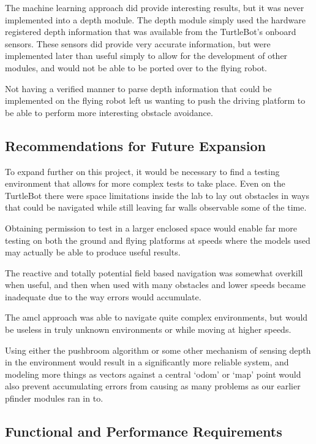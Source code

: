 \documentclass{article}[12]
\begin{document}
The machine learning approach did provide interesting results, but it was never implemented into a depth module. The depth module simply used the hardware registered depth information that was available from the TurtleBot's onboard sensors. These sensors did provide very accurate information, but were implemented later than useful simply to allow for the development of other modules, and would not be able to be ported over to the flying robot. 

Not having a verified manner to parse depth information that could be implemented on the flying robot left us wanting to push the driving platform to be able to perform more interesting obstacle avoidance.

\subsection{Recommendations for Future Expansion}

To expand further on this project, it would be necessary to find a testing environment that allows for more complex tests to take place. Even on the TurtleBot there were space limitations inside the lab to lay out obstacles in ways that could be navigated while still leaving far walls observable some of the time. 

Obtaining permission to test in a larger enclosed space would enable far more testing on both the ground and flying platforms at speeds where the models used may actually be able to produce useful results. 

The reactive and totally potential field based navigation was somewhat overkill when useful, and then when used with many obstacles and lower speeds became inadequate due to the way errors would accumulate.

The amcl approach was able to navigate quite complex environments, but would be useless in truly unknown environments or while moving at higher speeds. 

Using either the pushbroom algorithm or some other mechanism of sensing depth in the environment would result in a significantly more reliable system, and modeling more things as vectors against a central `odom' or `map' point would also prevent accumulating errors from causing as many problems as our earlier pfinder modules ran in to.
 
 \subsection{Functional and Performance Requirements}
\end{document}
